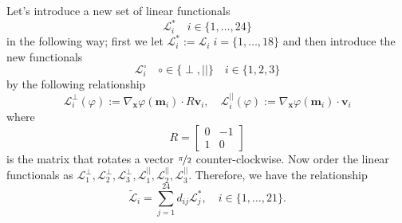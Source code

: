 Let's introduce a new set of linear functionals
\begin{equation*}
  \mathcal{L}^*_i \quad i\in\{1,\dots,24\}
\end{equation*}
in the following way; first we let $\mathcal{L}^*_i:=\mathcal{L}_i\;
i=\{1,\dots,18\}$ and then introduce the new functionals
\begin{equation*}
  \mathcal{L}^\circ_i \quad \circ \in \{\perp,||\}\quad i\in \{1,2,3\}
\end{equation*}
by the following relationship
\begin{equation*}
  \mathcal{L}_i^{\perp}(\varphi) := \nabla_{\mathbf{x}} \varphi(\mathbf{m}_i)
  \cdot R\mathbf{v}_i, \quad
  \mathcal{L}^{||}_i (\varphi) := \nabla_{\mathbf{x}} \varphi(\mathbf{m}_i)
  \cdot \mathbf{v}_i
\end{equation*}
where
\begin{equation*}
  R = \begin{bmatrix}
    0 & -1 \\ 1 & 0
  \end{bmatrix}
\end{equation*}
is the matrix that rotates a vector $\nicefrac{\pi}{2}$ counter-clockwise. Now
order the linear functionals as
$\mathcal{L}^{\perp}_1,\mathcal{L}^{\perp}_2,\mathcal{L}^{\perp}_3,
\mathcal{L}^{||}_1,\mathcal{L}^{||}_2,\mathcal{L}^{||}_3$.
Therefore, we have the relationship
\begin{equation}
  \tilde{\mathcal{L}}_i = \sum_{j=1}^{24} d_{ij} \mathcal{L}^*_j, \quad
    i\in\{1,\dots,21\}.
  \label{eqn:FunctionalsD}
\end{equation}

